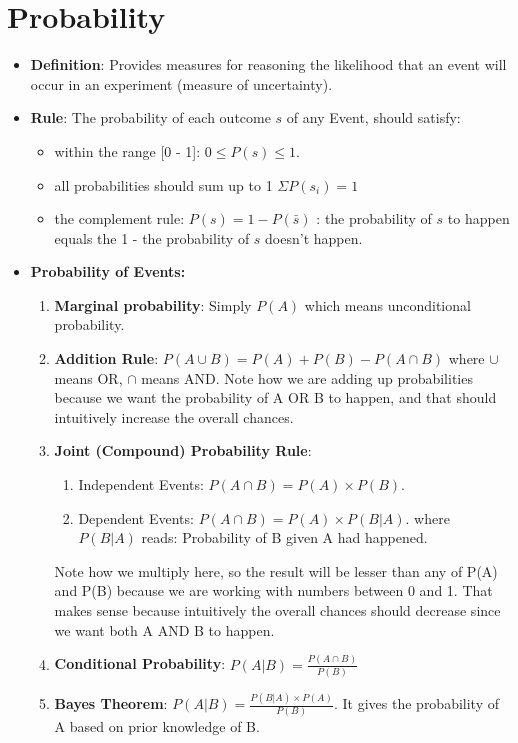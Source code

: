 \documentclass[11pt, twocolumn]{article}
\begin{document}
\section{Probability}
\begin{itemize}
\item \textbf{Definition}: Provides measures for reasoning the likelihood that an event will occur in an experiment (measure of uncertainty).
\end{itemize}
\begin{itemize}
\item \textbf{Rule}: The probability of each outcome $s$ of any Event, should satisfy:
\begin{itemize}
\item within the range [0 - 1]: $ 0 \leq P(s) \leq 1$.
\item all probabilities should sum up to 1 $\Sigma P(s_i) = 1$
\item the complement rule: $P(s) = 1 - P(\bar{s})$ : the probability of $s$ to happen equals the 1 - the probability of $s$ doesn't happen.
\end{itemize}
\end{itemize}
\begin{itemize}
\item \textbf{Probability of Events:}
\begin{enumerate}
\item \textbf{Marginal probability}: Simply $P(A)$ which means {\color{blue} unconditional probability}.
\item \textbf{Addition Rule}: $P(A \cup B) = P(A) + P(B) - P(A \cap B)$ where $\cup$ means OR, $\cap$ means AND. Note how we are {\color{blue}adding up} probabilities because we want the probability of A {\color{blue}OR} B to happen, and that should intuitively {\color{blue}increase} the overall chances.
\item \textbf{Joint (Compound) Probability Rule}:
	\begin{enumerate}
	\item Independent Events: $P(A \cap B) = P(A) \times P(B)$.
	\item Dependent Events: $P(A \cap B) = P(A) \times P(B | A)$. where $P(B | A)$ reads: Probability of B given A had happened.
	\end{enumerate}
	Note how we {\color{blue}multiply} here, so the result will be {\color{blue}lesser} than any of P(A) and P(B) because we are working with numbers between 0 and 1. That makes sense because intuitively the overall chances should {\color{blue}decrease} since we want both A {\color{blue}AND} B to happen.
\item \textbf{Conditional Probability}: $P(A | B) = \frac{P(A \cap B)}{P(B)}$
\item \textbf{Bayes Theorem}: $P(A | B) = \frac{P(B | A) \times P(A)}{P(B)}$. It gives the probability of A based on prior knowledge of B.
\end{enumerate}
\end{itemize}
\end{document}
